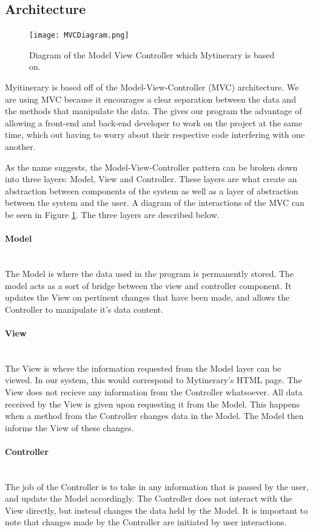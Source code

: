 \documentclass[12pt]{article}
\begin{document}
\subsection{Architecture}
%
\begin{figure}[ht!]
\centering
\texttt{[image: MVCDiagram.png]}
\caption{Diagram of the Model View Controller which Mytinerary is based on. \label{MVC}}
\end{figure}
%
Myitinerary is based off of the Model-View-Controller (MVC) architecture. We are using MVC because it encourages a clear separation between the data and the methods that manipulate the data. The gives our program the advantage of allowing a front-end and back-end developer to work on the project at the same time, which out having to worry about their respective code interfering with one another.

As the name suggests, the Model-View-Controller pattern can be broken down into three layers: Model, View and Controller. These layers are what create an abstraction between components of the system as well as a layer of abstraction between the system and the user. A diagram of the interactions of the MVC can be seen in Figure \ref{MVC}. The three layers are described below.
%
\paragraph*{Model}~\\
The Model is where the data used in the program is permanently stored. The model acts as a sort of bridge between the view and controller component. It updates the View on pertinent changes that have been made, and allows the Controller to manipulate it's data content. 
\paragraph*{View}~\\
The View is where the information requested from the Model layer can be viewed. In our system, this would correspond to Mytinerary's HTML page. The View does not recieve any information from the Controller whatsoever. All data received by the View is given upon requesting it from the Model. This happens when a method from the Controller changes data in the Model. The Model then informs the View of these changes.
%
\paragraph*{Controller}~\\
The job of the Controller is to take in any information that is passed by the user, and update the Model accordingly. The Controller does not interact with the View directly, but instead changes the data held by the Model. It is important to note that changes made by the Controller are initiated by user interactions.
%
\end{document}
